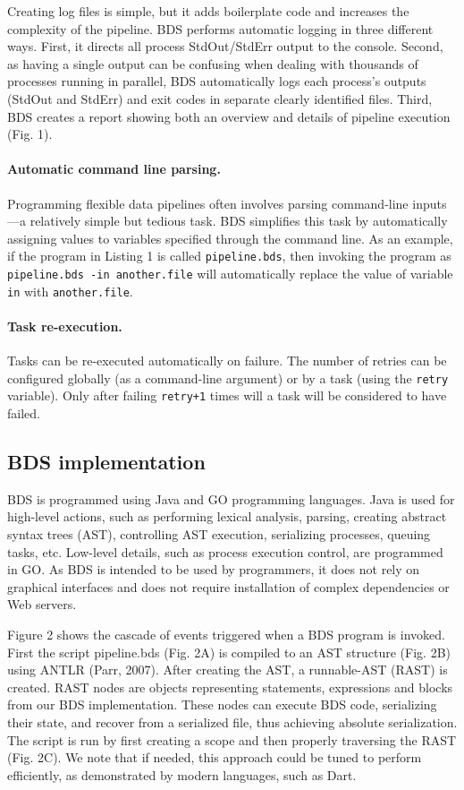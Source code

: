 Creating log files is simple, but it adds boilerplate code and increases the complexity of the pipeline. BDS performs automatic logging in three different ways. First, it directs all process StdOut/StdErr output to the console. Second, as having a single output can be confusing when dealing with thousands of processes running in parallel, BDS automatically logs each process’s outputs (StdOut and StdErr) and exit codes in separate clearly identified files. Third, BDS creates a report showing both an overview and details of pipeline execution (Fig. 1).

\paragraph{Automatic command line parsing.} Programming flexible data pipelines often involves parsing command-line inputs—a relatively simple but tedious task. BDS simplifies this task by automatically assigning values to variables specified through the command line. As an example, if the program in Listing 1 is called \texttt{pipeline.bds}, then invoking the program as \texttt{pipeline.bds -in another.file} will automatically replace the value of variable \texttt{in} with \texttt{another.file}.

\paragraph{Task re-execution.} Tasks can be re-executed automatically on failure. The number of retries can be configured globally (as a command-line argument) or by a task (using the \texttt{retry} variable). Only after failing \texttt{retry+1} times will a task will be considered to have failed.

\subsection{BDS implementation}

BDS is programmed using Java and GO programming languages. Java is used for high-level actions, such as performing lexical analysis, parsing, creating abstract syntax trees (AST), controlling AST execution, serializing processes, queuing tasks, etc. Low-level details, such as process execution control, are programmed in GO. As BDS is intended to be used by programmers, it does not rely on graphical interfaces and does not require installation of complex dependencies or Web servers.

Figure 2 shows the cascade of events triggered when a BDS program is invoked. First the script pipeline.bds (Fig. 2A) is compiled to an AST structure (Fig. 2B) using ANTLR (Parr, 2007). After creating the AST, a runnable-AST (RAST) is created. RAST nodes are objects representing statements, expressions and blocks from our BDS implementation. These nodes can execute BDS code, serializing their state, and recover from a serialized file, thus achieving absolute serialization. The script is run by first creating a scope and then properly traversing the RAST (Fig. 2C). We note that if needed, this approach could be tuned to perform efficiently, as demonstrated by modern languages, such as Dart.

